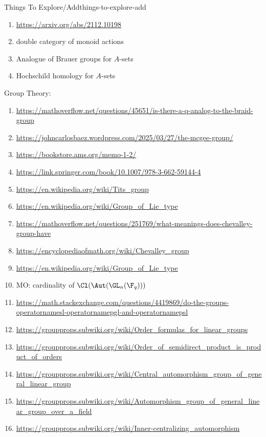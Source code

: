 \begin{remark}{Things To Explore/Add}{things-to-explore-add}
\begin{enumerate}
\begin{enumerate}
            \end{enumerate}
        \item \url{https://arxiv.org/abs/2112.10198}
        \item double category of monoid actions
        \item Analogue of Brauer groups for $A$-sets
        \item Hochschild homology for $A$-sets
    \end{enumerate}
    Group Theory:
    \begin{enumerate}
        \item \url{https://mathoverflow.net/questions/45651/is-there-a-q-analog-to-the-braid-group}
        \item \url{https://johncarlosbaez.wordpress.com/2025/03/27/the-mcgee-group/}
        \item \url{https://bookstore.ams.org/memo-1-2/}
        \item \url{https://link.springer.com/book/10.1007/978-3-662-59144-4}
        \item \url{https://en.wikipedia.org/wiki/Tits_group}
        \item \url{https://en.wikipedia.org/wiki/Group_of_Lie_type}
        \item \url{https://mathoverflow.net/questions/251769/what-meanings-does-chevalley-group-have}
        \item \url{https://encyclopediaofmath.org/wiki/Chevalley\_group}
        \item \url{https://en.wikipedia.org/wiki/Group\_of\_Lie\_type}
        \item MO: cardinality of $\Cl(\Aut(\GL_{n}(\F_{q})))$
        \item \url{https://math.stackexchange.com/questions/4419869/do-the-groups-operatornamesl-operatornamepgl-and-operatornamepsl}
        \item \url{https://groupprops.subwiki.org/wiki/Order\_formulas\_for\_linear\_groups}
        \item \url{https://groupprops.subwiki.org/wiki/Order\_of\_semidirect\_product\_is\_product\_of\_orders}
        \item \url{https://groupprops.subwiki.org/wiki/Central\_automorphism\_group\_of\_general\_linear\_group}
        \item \url{https://groupprops.subwiki.org/wiki/Automorphism\_group\_of\_general\_linear\_group\_over\_a\_field}
        \item \url{https://groupprops.subwiki.org/wiki/Inner-centralizing\_automorphism}

\end{enumerate}
\end{remark}
